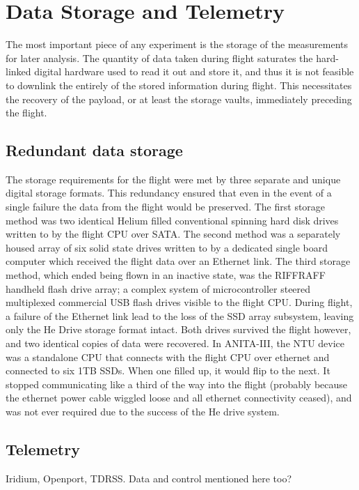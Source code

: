 \section{Data Storage and Telemetry}
	The most important piece of any experiment is the storage of the measurements for later analysis.  The quantity of data taken during flight saturates the hard-linked digital hardware used to read it out and store it, and thus it is not feasible to downlink the entirely of the stored information during flight.  This necessitates the recovery of the payload, or at least the storage vaults, immediately preceding the flight.

	\subsection{Redundant data storage}
		The storage requirements for the flight were met by three separate and unique digital storage formats.  This redundancy ensured that even in the event of a single failure the data from the flight would be preserved.  The first storage method was two identical Helium filled conventional spinning hard disk drives written to by the flight CPU over SATA.  The second method was a separately housed array of six solid state drives written to by a dedicated single board computer which received the flight data over an Ethernet link.  The third storage method, which ended being flown in an inactive state, was the RIFFRAFF handheld flash drive array; a complex system of microcontroller steered multiplexed commercial USB flash drives visible to the flight CPU.  During flight, a failure of the Ethernet link lead to the loss of the SSD array subsystem, leaving only the He Drive storage format intact.  Both drives survived the flight however, and two identical copies of data were recovered.
		In ANITA-III, the NTU device was a standalone CPU that connects with the flight CPU over ethernet and connected to six 1TB SSDs.  When one filled up, it would flip to the next.  It stopped communicating like a third of the way into the flight (probably because the ethernet power cable wiggled loose and all ethernet connectivity ceased), and was not ever required due to the success of the He drive system.
		
	
	\subsection{Telemetry}
		Iridium, Openport, TDRSS.  Data and control mentioned here too?
		
